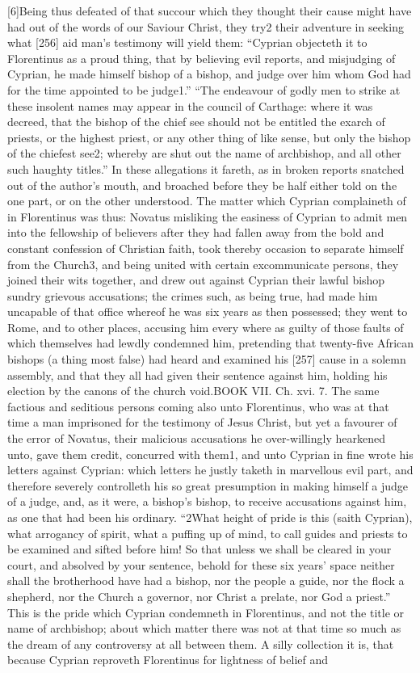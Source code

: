 [6]Being thus defeated of that succour which they thought their cause might have had out of the words of our Saviour Christ, they try2 their adventure in seeking what [256] aid man’s testimony will yield them: “Cyprian objecteth it to Florentinus as a proud thing, that by believing evil reports, and misjudging of Cyprian, he made himself bishop of a bishop, and judge over him whom God had for the time appointed to be judge1.” “The endeavour of godly men to strike at these insolent names may appear in the council of Carthage: where it was decreed, that the bishop of the chief see should not be entitled the exarch of priests, or the highest priest, or any other thing of like sense, but only the bishop of the chiefest see2; whereby are shut out the name of archbishop, and all other such haughty titles.” In these allegations it fareth, as in broken reports snatched out of the author’s mouth, and broached before they be half either told on the one part, or on the other understood. The matter which Cyprian complaineth of in Florentinus was thus: Novatus misliking the easiness of Cyprian to admit men into the fellowship of believers after they had fallen away from the bold and constant confession of Christian faith, took thereby occasion to separate himself from the Church3, and being united with certain excommunicate persons, they joined their wits together, and drew out against Cyprian their lawful bishop sundry grievous accusations; the crimes such, as being true, had made him uncapable of that office whereof he was six years as then possessed; they went to Rome, and to other places, accusing him every where as guilty of those faults of which themselves had lewdly condemned him, pretending that twenty-five African bishops (a thing most false) had heard and examined his [257] cause in a solemn assembly, and that they all had given their sentence against him, holding his election by the canons of the church void.BOOK VII. Ch. xvi. 7. The same factious and seditious persons coming also unto Florentinus, who was at that time a man imprisoned for the testimony of Jesus Christ, but yet a favourer of the error of Novatus, their malicious accusations he over-willingly hearkened unto, gave them credit, concurred with them1, and unto Cyprian in fine wrote his letters against Cyprian: which letters he justly taketh in marvellous evil part, and therefore severely controlleth his so great presumption in making himself a judge of a judge, and, as it were, a bishop’s bishop, to receive accusations against him, as one that had been his ordinary. “2What height of pride is this (saith Cyprian), what arrogancy of spirit, what a puffing up of mind, to call guides and priests to be examined and sifted before him! So that unless we shall be cleared in your court, and absolved by your sentence, behold for these six years’ space neither shall the brotherhood have had a bishop, nor the people a guide, nor the flock a shepherd, nor the Church a governor, nor Christ a prelate, nor God a priest.” This is the pride which Cyprian condemneth in Florentinus, and not the title or name of archbishop; about which matter there was not at that time so much as the dream of any controversy at all between them. A silly collection it is, that because Cyprian reproveth Florentinus for lightness of belief and 